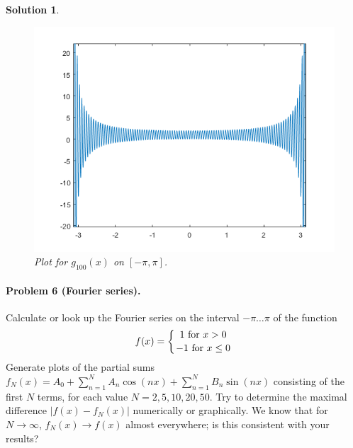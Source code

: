 \documentclass[leqno]{article}
\theoremstyle{nonumberplain}
\newtheorem{solution}{Solution}
\begin{document}
\begin{solution}
\begin{figure}[h]
    \centering
    \includegraphics{problem_3_9_hw_5.png}
    \caption{Plot for $g_{100}(x)$ on $[-\pi,\pi]$.}
    \label{fig:my_label}
\end{figure}
\pagebreak

\end{solution}
\pagebreak

\paragraph{Problem 6 (Fourier series).} Calculate or look up the Fourier
series on the interval $-\pi\ldots\pi$ of the function
\begin{gather*}
  f(x) = \left\{{1\ \text{for $x>0$} \atop -1\ \text{for $x\le 0$}}\right.
\end{gather*}
Generate plots of the partial sums $f_N(x)=A_0 + \sum_{n=1}^N A_n
\cos(nx) + \sum_{n=1}^{N} B_n \sin(nx)$ consisting of the first $N$ terms, for each value
$N=2, 5, 10, 20, 50$. Try to determine the maximal difference $|f(x)-f_N(x)|$
numerically or graphically. We know that for $N\rightarrow \infty$,
$f_N(x)\rightarrow f(x)$ almost everywhere; is this consistent with your
results?
\end{document}
